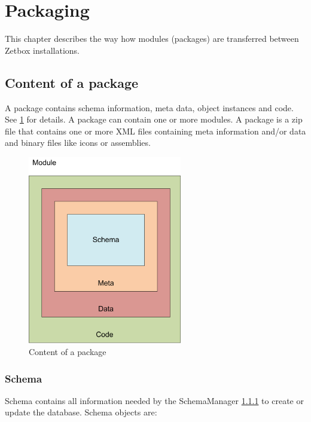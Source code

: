 \section{\label{Packaging}Packaging}
This chapter describes the way how modules (packages) are transferred between Zetbox installations.

\subsection{\label{Packaging_Content_of_a_package}Content of a package}

A package contains schema information, meta data, object instances and code. See \ref{content_of_package} for details. 
A package can contain one or more modules. A package is a zip file that contains one or more XML files containing meta information and/or data and binary files like icons or assemblies.

\begin{figure}[ht]
	\begin{center}
		\includegraphics[width=0.6\textwidth]{images/content_of_package.png}
		\caption{Content of a package}
		\label{content_of_package}
	\end{center}
\end{figure}

\subsubsection{\label{Packaging_Schema}Schema}

Schema contains all information needed by the SchemaManager \ref{} to create or update the database. Schema objects are:

